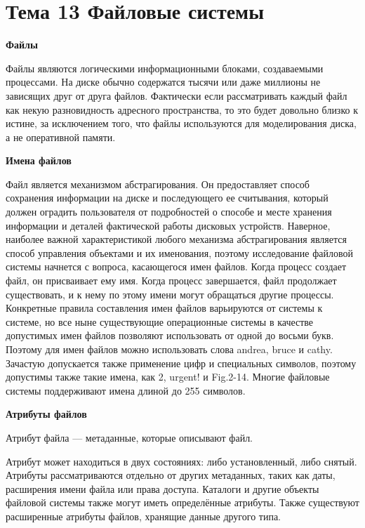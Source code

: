 \newpage 
\chapter{Тема 13 Файловые системы}

\begin{center}{\bfseries Файлы}
\end{center}
  

Файлы являются логическими информационными блоками, создаваемыми процессами. На диске обычно содержатся тысячи или даже миллионы не зависящих друг от друга файлов. Фактически если рассматривать каждый файл как некую разновидность адресного пространства, то это будет довольно близко к истине, за исключением того, что файлы используются для моделирования диска, а не оперативной памяти.

  \begin{center}{\bfseries Имена файлов}
  \end{center}

Файл является механизмом абстрагирования. Он предоставляет способ сохранения информации на диске и последующего ее считывания, который должен оградить пользователя от подробностей о способе и месте хранения информации и деталей фактической работы дисковых устройств. Наверное, наиболее важной характеристикой любого механизма абстрагирования является способ управления объектами и их именования, поэтому исследование файловой системы начнется с вопроса, касающегося имен файлов. Когда процесс создает файл, он присваивает ему имя. Когда процесс завершается, файл продолжает существовать, и к нему по этому имени могут обращаться другие процессы. Конкретные правила составления имен файлов варьируются от системы к системе, но все ныне существующие операционные системы в качестве допустимых имен файлов позволяют использовать от одной до восьми букв. Поэтому для имен файлов можно использовать слова andrea, bruce и cathy. Зачастую допускается также применение цифр и специальных символов, поэтому допустимы также такие имена, как 2, urgent! и Fig.2-14. Многие файловые системы поддерживают имена длиной до 255 символов.

\begin{center}{\bfseries Атрибуты файлов}
\end{center}
\begin{opr} 
  Атрибут файла — метаданные, которые описывают файл.
\end{opr}
Атрибут может находиться в двух состояниях: либо установленный, либо снятый. Атрибуты рассматриваются отдельно от других метаданных, таких как даты, расширения имени файла или права доступа. Каталоги и другие объекты файловой системы также могут иметь определённые атрибуты. Также существуют расширенные атрибуты файлов, хранящие данные другого типа.

